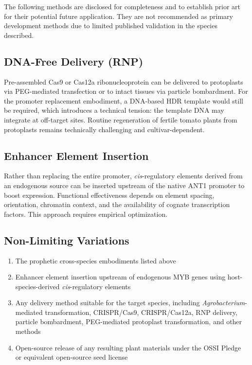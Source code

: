 \documentclass[12pt,a4paper]{article}
\begin{document}
The following methods are disclosed for completeness and to establish prior art for their potential future application. They are not recommended as primary development methods due to limited published validation in the species described.

\subsection{DNA-Free Delivery (RNP)}
Pre-assembled Cas9 or Cas12a ribonucleoprotein can be delivered to protoplasts via PEG-mediated transfection or to intact tissues via particle bombardment. For the promoter replacement embodiment, a DNA-based HDR template would still be required, which introduces a technical tension: the template DNA may integrate at off-target sites. Routine regeneration of fertile tomato plants from protoplasts remains technically challenging and cultivar-dependent.

\subsection{Enhancer Element Insertion}
Rather than replacing the entire promoter, \textit{cis}-regulatory elements derived from an endogenous source can be inserted upstream of the native ANT1 promoter to boost expression. Functional effectiveness depends on element spacing, orientation, chromatin context, and the availability of cognate transcription factors. This approach requires empirical optimization.

\subsection{Non-Limiting Variations}
\begin{enumerate}
  \item The prophetic cross-species embodiments listed above
  \item Enhancer element insertion upstream of endogenous MYB genes using host-species-derived \textit{cis}-regulatory elements
  \item Any delivery method suitable for the target species, including \textit{Agrobacterium}-mediated transformation, CRISPR/Cas9, CRISPR/Cas12a, RNP delivery, particle bombardment, PEG-mediated protoplast transformation, and other methods
  \item Open-source release of any resulting plant materials under the OSSI Pledge or equivalent open-source seed license
\end{enumerate}
\end{document}
